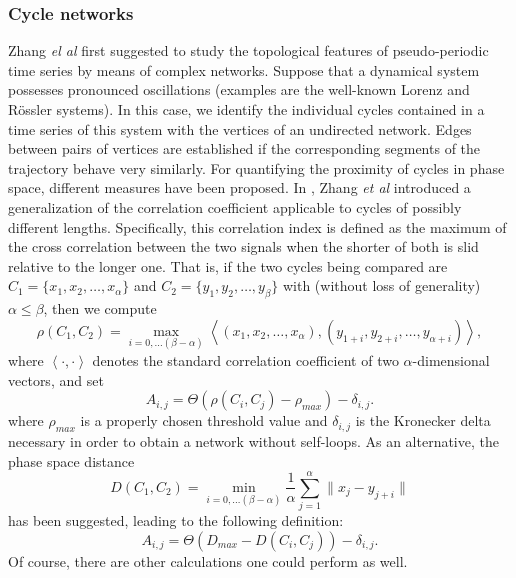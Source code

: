 		\subsubsection{Cycle networks}
		Zhang {\textit{el al}} \cite{Zhang2006} first suggested to study the topological features of pseudo-periodic time series by means of complex networks. Suppose that a dynamical system possesses pronounced oscillations (examples are the well-known Lorenz and R\"ossler systems). In this case, we identify the individual cycles contained in a time series of this system with the vertices of an undirected network. Edges between pairs of vertices are established if the corresponding segments of the trajectory behave very similarly. For quantifying the proximity of cycles in phase space, different measures have been proposed. In \cite{Zhang2006b}, Zhang {\textit {et al}} introduced a generalization of the correlation coefficient applicable to cycles of possibly different lengths. Specifically, this correlation index is defined as the maximum of the cross correlation between the two signals when the shorter of both is slid relative to the longer one. That is, if the two cycles being compared are $C_1=\{x_1,x_2,\ldots,x_{\alpha}\}$ and $C_2=\{y_1,y_2,\ldots,y_{\beta}\}$ with (without loss of generality) $\alpha \leq \beta$, then we compute 
\begin{equation}
\rho(C_1,C_2)=\max_{i=0,\ldots (\beta-\alpha)} \left<(x_1,x_2,\ldots,x_{\alpha}),(y_{1+i},y_{2+i},\ldots, y_{\alpha+i})\right>,
\label{cyclecorr}
\end{equation}
where $\left<\cdot,\cdot\right>$ denotes the standard correlation coefficient of two $\alpha$-dimensional vectors, and set
\begin{equation}
A_{i,j}=\Theta(\rho(C_i,C_j)-\rho_{max})-\delta_{i,j}.
\end{equation}
where $\rho_{max}$ is a properly chosen threshold value and $\delta_{i,j}$ is the Kronecker delta necessary in order to obtain a network without self-loops. As an alternative, the phase space distance~\cite{Zhang2006b}
\begin{equation}
D(C_1,C_2)=\min_{i=0,\ldots (\beta-\alpha)} \frac{1}{\alpha} \sum_{j=1}^{\alpha} \|x_j-y_{j+i}\|
\label{psd}
\end{equation}
has been suggested, leading to the following definition: 
\begin{equation}
A_{i,j}=\Theta(D_{max}-D(C_i,C_j))-\delta_{i,j}.
\end{equation}
\noindent 
Of course, there are other calculations one could perform as well. 

